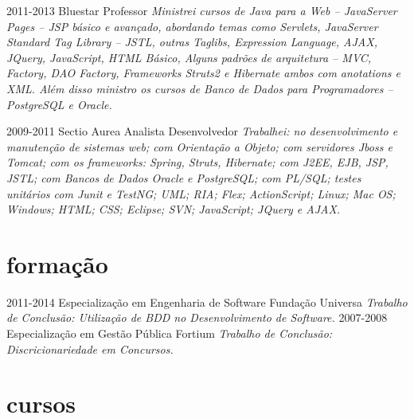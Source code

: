 \begin{entrylist}
  \entry
    {2011-2013}
    {Bluestar}
    {Professor}
    {\emph{Ministrei cursos de Java para a Web – JavaServer Pages – JSP básico e avançado, abordando temas como Servlets, JavaServer Standard Tag Library – JSTL, outras Taglibs, Expression Language, AJAX, JQuery, JavaScript, HTML Básico, Alguns padrões de arquitetura – MVC, Factory, DAO Factory, Frameworks Struts2 e Hibernate ambos com anotations e XML. Além disso ministro os cursos de Banco de Dados para Programadores – PostgreSQL e Oracle.}}
\end{entrylist}

\newpage

\begin{entrylist}
  \entry
    {2009-2011}
    {Sectio Aurea}
    {Analista Desenvolvedor}
    {\emph{Trabalhei: no desenvolvimento e manutenção de sistemas web; com Orientação a Objeto; com servidores Jboss e Tomcat; com os frameworks: Spring, Struts, Hibernate; com J2EE, EJB, JSP, JSTL; com Bancos de Dados Oracle e PostgreSQL; com PL/SQL; testes unitários com Junit e TestNG; UML; RIA; Flex; ActionScript; Linux; Mac OS; Windows; HTML; CSS; Eclipse; SVN; JavaScript; JQuery e AJAX.}}
\end{entrylist}

\section{formação}

\begin{entrylist}
  \entry
    {2011-2014}
    {Especialização {\normalfont em Engenharia de Software}}
    {Fundação Universa}
    {\emph{Trabalho de Conclusão: Utilização de BDD no Desenvolvimento de Software.}}
  \entry
    {2007-2008}
    {Especialização {\normalfont em Gestão Pública}}
    {Fortium}
    {\emph{Trabalho de Conclusão: Discricionariedade em Concursos.}}
\end{entrylist}

\section{cursos}

